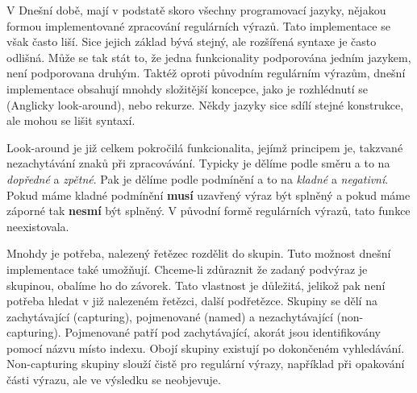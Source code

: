 V Dnešní době, mají v podstatě skoro všechny programovací jazyky, nějakou formou implementované zpracování regulárních výrazů.
Tato implementace se však často liší. 
Sice jejich základ bývá stejný, ale rozšířená syntaxe je často odlišná.
Může se tak stát to, že jedna funkcionality podporována jedním jazykem, není podporovana druhým.
Taktéž oproti původním regulárním výrazům, dnešní implementace obsahují mnohdy složitější koncepce, jako je rozhlédnutí se (Anglicky look-around), nebo rekurze.
Někdy jazyky sice sdílí stejné konstrukce, ale mohou se lišit syntaxí.

Look-around je již celkem pokročilá funkcionalita, jejímž principem je, takzvané nezachytávání znaků při zpracovávání.
Typicky je dělíme podle směru a to na \textit{dopředné} a \textit{zpětné}.
Pak je dělíme podle podmínění a to na \textit{kladné} a \textit{negativní}.
Pokud máme kladné podmínění \textbf{musí} uzavřený výraz být splněný a pokud máme záporné tak \textbf{nesmí} být splněný.
V původní formě regulárních výrazů, tato funkce neexistovala.

Mnohdy je potřeba, nalezený řetězec rozdělit do skupin. 
Tuto možnost dnešní implementace také umožňují.
Chceme-li zdůraznit že zadaný podvýraz je skupinou, obalíme ho do závorek.
Tato vlastnost je důležitá, jelikož pak není potřeba hledat v již nalezeném řetězci, další podřetězce.
Skupiny se dělí na zachytávající (capturing), pojmenované (named) a nezachytávající (non-capturing).
Pojmenované patří pod zachytávající, akorát jsou identifikovány pomocí názvu místo indexu.
Obojí skupiny existují po dokončeném vyhledávání.
Non-capturing skupiny slouží čistě pro regulární výrazy, například při opakování části výrazu, ale ve výsledku se neobjevuje.

\endinput

